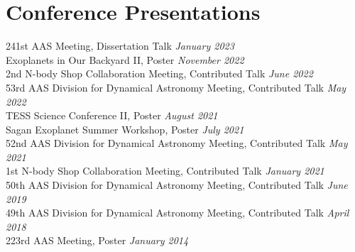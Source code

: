 \documentclass[letterpaper,11pt]{article}
\newcommand{\ConferenceEntry}[2]{#1 \hfill {\em #2}}
\newcommand{\resumeSubHeadingListStart}{\begin{itemize}[leftmargin=0.15in, label={}]}
\newcommand{\resumeSubHeadingListEnd}{\end{itemize}}
\begin{document}
\section{Conference Presentations}
  \resumeSubHeadingListStart
    \small{\item{
    
 \ConferenceEntry{241st AAS Meeting, Dissertation Talk}{January 2023} \\ 
 \ConferenceEntry{Exoplanets in Our Backyard II, Poster}{November 2022} \\ 
 \ConferenceEntry{2nd N-body Shop Collaboration Meeting, Contributed Talk}{June 2022} \\
 \ConferenceEntry{53rd AAS Division for Dynamical Astronomy Meeting, Contributed Talk}{May 2022} \\ 
 \ConferenceEntry{TESS Science Conference II, Poster}{August 2021} \\ 
 \ConferenceEntry{Sagan Exoplanet Summer Workshop, Poster}{July 2021} \\ 
 \ConferenceEntry{52nd AAS Division for Dynamical Astronomy Meeting, Contributed Talk}{May 2021} \\ 
 \ConferenceEntry{1st N-body Shop Collaboration Meeting, Contributed Talk}{January 2021} \\ 
 \ConferenceEntry{50th AAS Division for Dynamical Astronomy Meeting, Contributed Talk}{June 2019} \\ 
  \ConferenceEntry{49th AAS Division for Dynamical Astronomy Meeting, Contributed Talk}{April 2018} \\ 
  \ConferenceEntry{223rd AAS Meeting, Poster}{January 2014} \\ 
 
 \vspace{6pt}

 }}     
  \resumeSubHeadingListEnd
  
\end{document}
